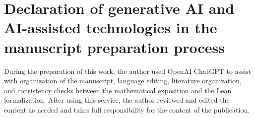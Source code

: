 \documentclass[11pt]{article}
\begin{document}
\section*{Declaration of generative AI and AI-assisted technologies in the manuscript preparation process}

During the preparation of this work, the author used OpenAI ChatGPT to assist
with organization of the manuscript, language editing, literature
organization, and consistency checks between the mathematical exposition and
the Lean formalization. After using this service, the author reviewed and
edited the content as needed and takes full responsibility for the content of
the publication.



\end{document}
